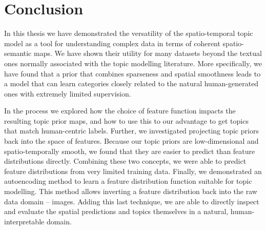 
\chapter{Conclusion}

In this thesis we have demonstrated the versatility of the spatio-temporal topic model as a tool for understanding complex data in terms of coherent spatio-semantic maps. We have shown their utility for many datasets beyond the textual ones normally associated with the topic modelling literature. More specifically, we have found that a prior that combines sparseness and spatial smoothness leads to a model that can learn categories closely related to the natural human-generated ones with extremely limited supervision.

In the process we explored how the choice of feature function impacts the resulting topic prior maps, and how to use this to our advantage to get topics that match human-centric labels. Further, we investigated projecting topic priors back into the space of features. Because our topic priors are low-dimensional and spatio-temporally smooth, we found that they are easier to predict than feature distributions directly. Combining these two concepts, we were able to predict feature distributions from very limited training data. Finally, we demonstrated an autoencoding method to learn a feature distribution function suitable for topic modelling. This method allows inverting a feature distribution back into the raw data domain -- images. Adding this last technique, we are able to directly inspect and evaluate the spatial predictions and topics themselves in a natural, human-interpretable domain.

